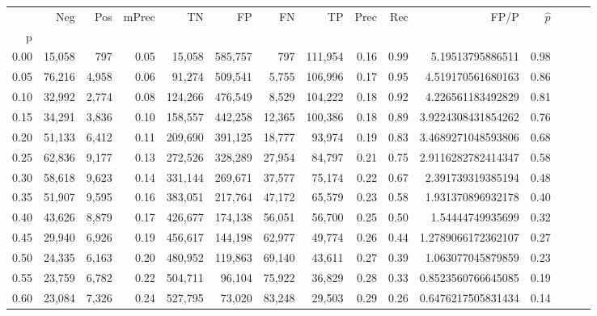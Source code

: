 \begin{tabular}{rrrrrrrrrrrrrrr}
\toprule
{} &     Neg &    Pos & mPrec &       TN &       FP &       FN &       TP &  Prec &   Rec &                 FP/P & $\hat{p}$ \\
p    &         &        &       &          &          &          &          &       &       &                      &           \\
\midrule
0.00 &  15,058 &    797 &  0.05 &   15,058 &  585,757 &      797 &  111,954 &  0.16 &  0.99 &     5.19513795886511 &      0.98 \\
0.05 &  76,216 &  4,958 &  0.06 &   91,274 &  509,541 &    5,755 &  106,996 &  0.17 &  0.95 &    4.519170561680163 &      0.86 \\
0.10 &  32,992 &  2,774 &  0.08 &  124,266 &  476,549 &    8,529 &  104,222 &  0.18 &  0.92 &    4.226561183492829 &      0.81 \\
0.15 &  34,291 &  3,836 &  0.10 &  158,557 &  442,258 &   12,365 &  100,386 &  0.18 &  0.89 &   3.9224308431854262 &      0.76 \\
0.20 &  51,133 &  6,412 &  0.11 &  209,690 &  391,125 &   18,777 &   93,974 &  0.19 &  0.83 &   3.4689271048593806 &      0.68 \\
0.25 &  62,836 &  9,177 &  0.13 &  272,526 &  328,289 &   27,954 &   84,797 &  0.21 &  0.75 &   2.9116282782414347 &      0.58 \\
0.30 &  58,618 &  9,623 &  0.14 &  331,144 &  269,671 &   37,577 &   75,174 &  0.22 &  0.67 &    2.391739319385194 &      0.48 \\
0.35 &  51,907 &  9,595 &  0.16 &  383,051 &  217,764 &   47,172 &   65,579 &  0.23 &  0.58 &    1.931370896932178 &      0.40 \\
0.40 &  43,626 &  8,879 &  0.17 &  426,677 &  174,138 &   56,051 &   56,700 &  0.25 &  0.50 &     1.54444749935699 &      0.32 \\
0.45 &  29,940 &  6,926 &  0.19 &  456,617 &  144,198 &   62,977 &   49,774 &  0.26 &  0.44 &   1.2789066172362107 &      0.27 \\
0.50 &  24,335 &  6,163 &  0.20 &  480,952 &  119,863 &   69,140 &   43,611 &  0.27 &  0.39 &    1.063077045879859 &      0.23 \\
0.55 &  23,759 &  6,782 &  0.22 &  504,711 &   96,104 &   75,922 &   36,829 &  0.28 &  0.33 &   0.8523560766645085 &      0.19 \\
0.60 &  23,084 &  7,326 &  0.24 &  527,795 &   73,020 &   83,248 &   29,503 &  0.29 &  0.26 &   0.6476217505831434 &      0.14 \\

\end{tabular}
